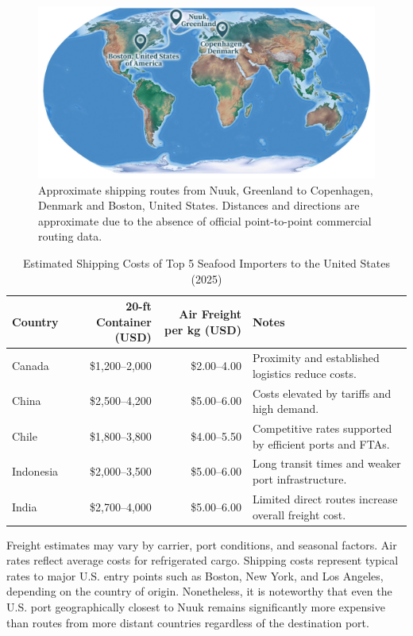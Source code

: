 \documentclass{adonis}
\begin{document}
    \begin{figure}[H]
        \centering
        \includegraphics[width=.75\linewidth]{images/trade-routes.png}
        \caption{Approximate shipping routes from Nuuk, Greenland to Copenhagen, Denmark and Boston, United States. Distances and directions are approximate due to the absence of official point-to-point commercial routing data.}
        \label{fig:trade-routes}
    \end{figure}

    \renewcommand{\arraystretch}{0.95}
\begin{table}[H]
\centering
\small
\begin{threeparttable}
\caption{Estimated Shipping Costs of Top 5 Seafood Importers to the United States (2025) \citep{freightos2025canada, dantful2025china, icontainers2025chile, freightos2025indonesia, freightos2025india}}
\label{tab:seafood-shipping-costs}
\begin{tabular}{@{}l@{\hskip 6pt}r@{\hskip 6pt}r@{\hskip 6pt}p{5.2cm}@{}}
\toprule
\textbf{Country} & \textbf{20-ft Container (USD)} & \textbf{Air Freight per kg (USD)} & \textbf{Notes} \\
\midrule
Canada     & \$1,200–2,000 & \$2.00–4.00 & Proximity and established logistics reduce costs. \\
China      & \$2,500–4,200 & \$5.00–6.00 & Costs elevated by tariffs and high demand. \\
Chile      & \$1,800–3,800 & \$4.00–5.50 & Competitive rates supported by efficient ports and FTAs. \\
Indonesia  & \$2,000–3,500 & \$5.00–6.00 & Long transit times and weaker port infrastructure. \\
India      & \$2,700–4,000 & \$5.00–6.00 & Limited direct routes increase overall freight cost. \\
\bottomrule
\end{tabular}
\begin{tablenotes}
\footnotesize
\item Freight estimates may vary by carrier, port conditions, and seasonal factors. Air rates reflect average costs for refrigerated cargo. Shipping costs represent typical rates to major U.S. entry points such as Boston, New York, and Los Angeles, depending on the country of origin. Nonetheless, it is noteworthy that even the U.S. port geographically closest to Nuuk remains significantly more expensive than routes from more distant countries regardless of the destination port.
\end{tablenotes}
\end{threeparttable}
\end{table}
\end{document}

